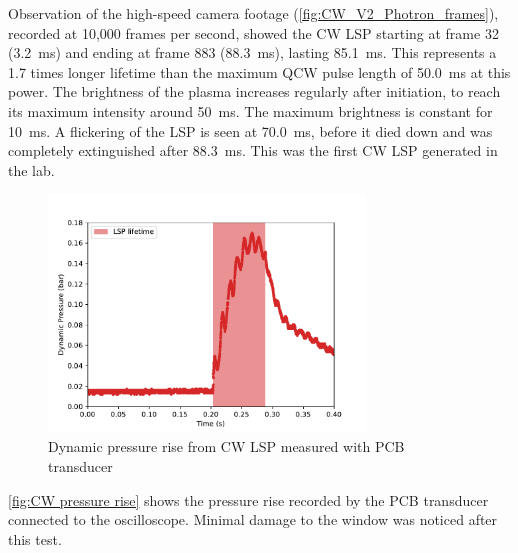             

            Observation of the high-speed camera footage (\autoref{fig:CW_V2_Photron_frames}), recorded at 10,000 frames per second, showed the CW LSP starting at frame 32 (\qty{3.2}{ms}) and ending at frame 883 (\qty{88.3}{ms}), lasting \qty{85.1}{ms}. This represents a 1.7 times longer lifetime than the maximum QCW pulse length of \qty{50.0}{ms} at this power. The brightness of the plasma increases regularly after initiation, to reach its maximum intensity around \qty{50}{ms}. The maximum brightness is constant for \qty{10}{ms}. A flickering of the LSP is seen at \qty{70.0}{ms}, before it died down and was completely extinguished after \qty{88.3}{ms}. This was the first CW LSP generated in the lab.

            \begin{figure}[!ht]
                \centering
                \includegraphics[width=0.75\textwidth]{assets/4 experiments/CW pressure rise.pdf}
                \caption{Dynamic pressure rise from CW LSP measured with PCB transducer}
                \label{fig:CW pressure rise}
            \end{figure}

            \autoref{fig:CW pressure rise} shows the pressure rise recorded by the PCB transducer connected to the oscilloscope. Minimal damage to the window was noticed after this test.


    
